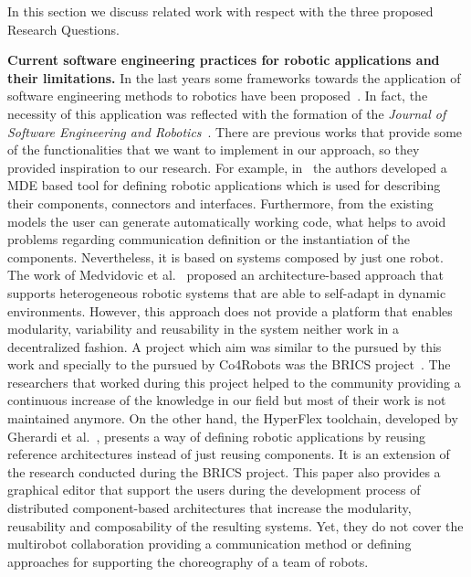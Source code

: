 In this section we discuss related work with respect with the three proposed Research Questions.

\textbf{Current software engineering practices for robotic applications and their limitations.}
In the last years some frameworks towards the application of software engineering methods to robotics have been proposed~\cite{Ramaswamy2014}.
In fact, the necessity of this application was reflected with the formation of the \emph{Journal of Software Engineering and Robotics}~\cite{Brugali2010_journal}.
There are previous works that provide some of the functionalities that we want to implement in our approach, so they provided inspiration to our research.
For example, in~\cite{wenger} the authors developed a MDE based tool for defining robotic applications which is used for describing their components, connectors and interfaces.
Furthermore, from the existing models the user can generate automatically working code, what helps to avoid problems regarding communication definition or the instantiation of the components.
Nevertheless, it is based on systems composed by just one robot.
The work of Medvidovic et al.~\cite{medvidovic} proposed an architecture-based approach that supports heterogeneous robotic systems that are able to self-adapt in dynamic environments.
However, this approach does not provide a platform that enables modularity, variability and reusability in the system neither work in a decentralized fashion.
A project which aim was similar to the pursued by this work and specially to the pursued by Co4Robots was the BRICS project~\cite{Bischoff2010}. 
The researchers that worked during this project helped to the community providing a continuous increase of the knowledge in our field but most of their work is not maintained anymore.
On the other hand, the HyperFlex toolchain, developed by Gherardi et al.~\cite{gherardi}, presents a way of defining robotic applications by reusing reference architectures instead of just reusing components.
It is an extension of the research conducted during the BRICS project.
This paper also provides a graphical editor that support the users during the development process of distributed component-based architectures that increase the modularity, reusability and composability of the resulting systems.
Yet, they do not cover the multirobot collaboration providing a communication method or defining approaches for supporting the choreography of a team of robots.

